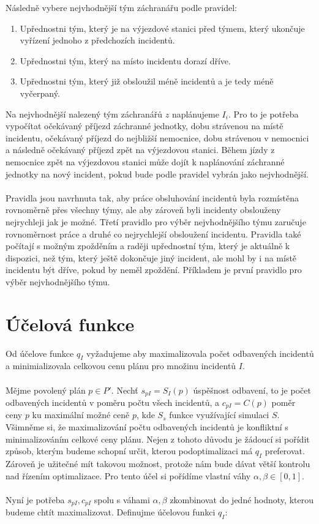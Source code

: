 Následně vybere nejvhodnější tým záchranářu podle pravidel:

\begin{enumerate}
  \item Upřednostni tým, který je na výjezdové stanici před týmem, který ukončuje vyřízení jednoho z předchozích incidentů. 
  \item Upřednostni tým, který na místo incidentu dorazí dříve. 
  \item Upřednostni tým, který již obsloužil méně incidentů a je tedy méně vyčerpaný.
\end{enumerate}

\clearpage

Na nejvhodnější nalezený tým záchranářů $z$ naplánujeme $I_i$. Pro to je potřeba vypočítat očekávaný příjezd záchranné jednotky, dobu strávenou na místě incidentu, očekávaný příjezd
do nejbližší nemocnice, dobu strávenou v nemocnici a následně očekávaný příjezd zpět na výjezdovou stanici.
Během jízdy z nemocnice zpět na výjezdovou stanici může dojít k naplánování záchranné jednotky na nový incident, pokud bude podle pravidel vybrán jako nejvhodnější.
\\
\\
Pravidla jsou navrhnuta tak, aby práce obsluhování incidentů byla rozmístěna rovnoměrně přes všechny týmy, ale aby zároveň byli incidenty obslouženy nejrychleji jak je možné.
Třetí pravidlo pro výběr nejvhodnějšího týmu zaručuje rovnoměrnost práce a druhé co nejrychlejší obsloužení incidentu.
Pravidla také počítají s možným zpožděním a raději upřednostní tým, který je aktuálně k dispozici, než tým, který ještě dokončuje jiný incident, ale mohl by i na místě incidentu
být dříve, pokud by neměl zpoždění. Příkladem je první pravidlo pro výběr nejvhodnějšího týmu.

\section{Účelová funkce}

Od účelove funkce $q_I$ vyžadujeme aby maximalizovala počet odbavených incidentů a minimializovala celkovou cenu plánu pro množinu incidentů $I$.
\\
\\
Mějme povolený plán $p \in P'$. Nechť $s_{pI} = S_I(p)$ úspěšnost odbavení, to je počet odbavených incidentů v poměru počtu všech incidentů,
a $c_{pI} = C(p)$ poměr ceny $p$ ku maximální možné ceně $p$, kde $S_s$ funkce využívající simulaci $S$.
Všimněme si, že maximalizování počtu odbavených incidentů je konfliktní s minimalizováním celkové ceny plánu.
Nejen z tohoto důvodu je žádoucí si pořídit způsob, kterým budeme schopní určit, kterou podoptimalizaci má $q_I$ preferovat.
Zároveň je užitečné mít takovou možnost, protože nám bude dávat větší kontrolu nad řízením optimalizace.
Pro tento účel si pořídíme vlastní váhy $\alpha, \beta \in [0, 1]$.
\\
\\
Nyní je potřeba $s_{pI}, c_{pI}$ spolu s váhami $\alpha, \beta$ zkombinovat do jedné hodnoty, kterou budeme chtít maximalizovat.
Definujme účelovou funkci $q_I$:

